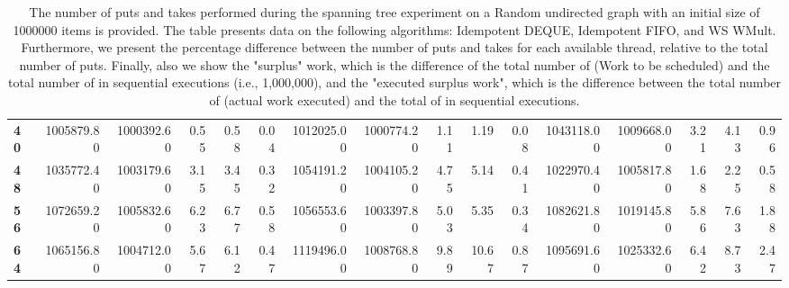 \begin{table}[!ht]
{\begin{tabular}{lrrrrrrrrrrrrrrr}
\textbf{40} &       1005879.80 & 1000392.60 &           0.55 &        0.58 &                 0.04 &      1012025.00 & 1000774.20 &           1.11 &        1.19 &                 0.08 & 1043118.00 & 1009668.00 &           3.21 &        4.13 &                 0.96 \\
\textbf{48} &       1035772.40 & 1003179.60 &           3.15 &        3.45 &                 0.32 &      1054191.20 & 1004105.20 &           4.75 &        5.14 &                 0.41 & 1022970.40 & 1005817.80 &           1.68 &        2.25 &                 0.58 \\
\textbf{56} &       1072659.20 & 1005832.60 &           6.23 &        6.77 &                 0.58 &      1056553.60 & 1003397.80 &           5.03 &        5.35 &                 0.34 & 1082621.80 & 1019145.80 &           5.86 &        7.63 &                 1.88 \\
\textbf{64} &       1065156.80 & 1004712.00 &           5.67 &        6.12 &                 0.47 &      1119496.00 & 1008768.80 &           9.89 &       10.67 &                 0.87 & 1095691.60 & 1025332.60 &           6.42 &        8.73 &                 2.47 \\
\bottomrule
\end{tabular}}
\label{difference-Random_undirected-1000000-IDEMPOTENT_DEQUE-IDEMPOTENT_FIFO-WS_NC_MULT_OPT}
\caption{The number of puts and takes performed during the
    spanning tree experiment on a Random undirected graph with an initial size
    of 1000000 items is provided. The table presents data on the
    following algorithms: Idempotent DEQUE, Idempotent FIFO, and
    WS WMult. Furthermore, we present the percentage difference
    between the number of puts and takes for each available thread,
    relative to the total number of puts. Finally, also we show the
    "surplus" work, which is the difference of the total number of
    \Puts (Work to be scheduled) and the total number of \Puts in
    sequential executions (i.e., 1,000,000), and the "executed surplus
    work", which is the difference between the total number of \Takes
    (actual work executed) and the total of \Takes in sequential
    executions.}
\end{table}
